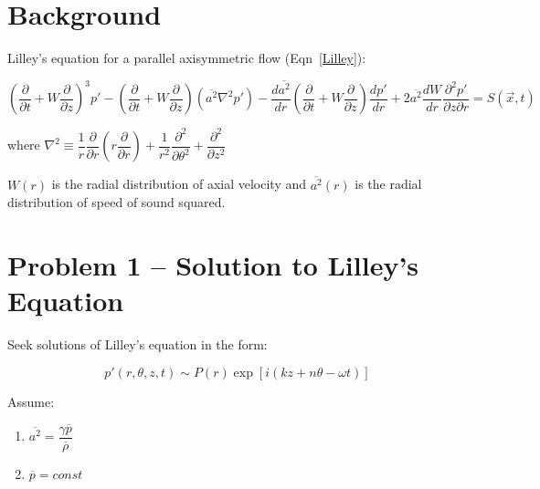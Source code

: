 \documentclass[]{aiaa-tc}%
\begin{document}
\section{Background} %

Lilley's equation for a parallel axisymmetric flow (Eqn~\ref{Lilley}):

\begin{equation} \label{Lilley}
\left( \dfrac{\partial}{\partial t} + W \dfrac{\partial}{\partial z} \right)^3 p'
- \left( \dfrac{\partial}{\partial t} + W \dfrac{\partial}{\partial z} \right) \left( \overline{a^2} \nabla^2p' \right)
- \dfrac{d \overline{a^2}}{dr} \left( \dfrac{\partial}{\partial t} + W \dfrac{\partial}{\partial z} \right) \dfrac{dp'}{dr}
+ 2\overline{a^2} \dfrac{dW}{dr}\dfrac{\partial^2 p'}{\partial z \partial r}
= S(\vec{x}, t)
\end{equation}

\begin{center}
where $\nabla^2 \equiv \dfrac{1}{r}\dfrac{\partial}{\partial r} \left( r\dfrac{\partial}{\partial r} \right)
+ \dfrac{1}{r^2}\dfrac{\partial^2}{\partial \theta^2}
+ \dfrac{\partial^2}{\partial z^2}$
\end{center}


$W(r)$ is the radial distribution of axial velocity and $\overline{a^2}(r)$ is the radial distribution of speed of sound squared.



\section{Problem 1 -- Solution to Lilley's Equation} %

Seek solutions of Lilley's equation in the form:

\begin{equation} \label{SolnForm}
p'(r, \theta, z, t) \sim P(r) \exp\left[ i(kz + n\theta -\omega t) \right]
\end{equation}

\noindent Assume:
\begin{enumerate}
  \item $\overline{a^2} = \dfrac{\gamma \overline{p}}{\overline{\rho}}$
  \item $\overline{p} = const$
\end{enumerate}
\end{document}
